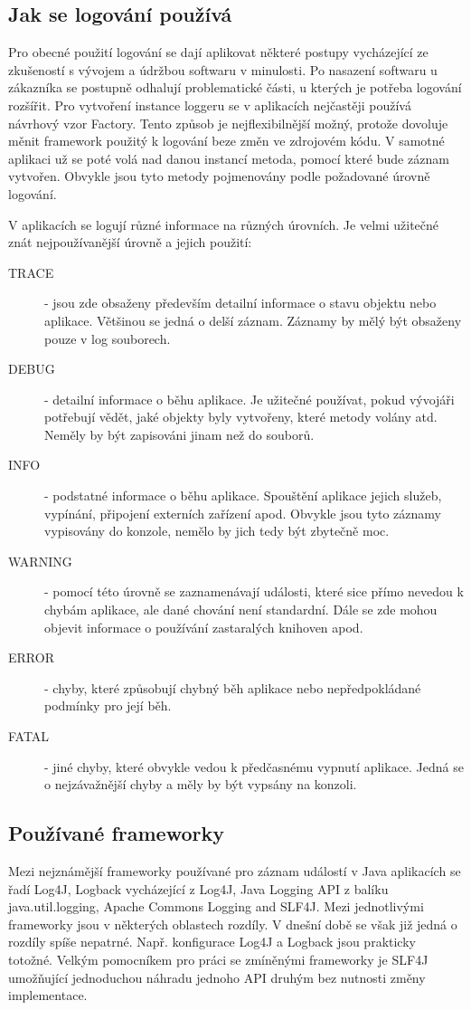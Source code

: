 \documentclass[ing,male,java,dept460]{diploma}		%
\begin{document}
\subsection{Jak se logování používá}
Pro obecné použití logování se dají aplikovat některé postupy vycházející ze zkušeností s vývojem a údržbou softwaru v minulosti. Po nasazení softwaru u zákazníka se postupně odhalují problematické části, u kterých je potřeba logování rozšířit. Pro vytvoření instance loggeru se v aplikacích nejčastěji používá návrhový vzor Factory. Tento způsob je nejflexibilnější možný, protože dovoluje měnit framework použitý k logování beze změn ve zdrojovém kódu. V samotné aplikaci už se poté volá nad danou instancí metoda, pomocí které bude záznam vytvořen. Obvykle jsou tyto metody pojmenovány podle požadované úrovně logování.
\par V aplikacích se logují různé informace na různých úrovních. Je velmi užitečné znát nejpoužívanější úrovně a jejich použití:
\begin{description}
	\item[TRACE] - jsou zde obsaženy především detailní informace o stavu objektu nebo aplikace. Většinou se jedná o delší záznam. Záznamy by mělý být obsaženy pouze v log souborech.
	\item[DEBUG] - detailní informace o běhu aplikace. Je užitečné používat, pokud vývojáři potřebují vědět, jaké objekty byly vytvořeny, které metody volány atd. Neměly by být zapisováni jinam než do souborů.
	\item[INFO] - podstatné informace o běhu aplikace. Spouštění aplikace jejich služeb, vypínání, připojení externích zařízení apod. Obvykle jsou tyto záznamy vypisovány do konzole, nemělo by jich tedy být zbytečně moc.
	\item[WARNING] - pomocí této úrovně se zaznamenávají události, které sice přímo nevedou k chybám aplikace, ale dané chování není standardní. Dále se zde mohou objevit informace o používání zastaralých knihoven apod.
	\item[ERROR] - chyby, které způsobují chybný běh aplikace nebo nepředpokládané podmínky pro její běh.
	\item[FATAL] - jiné chyby, které obvykle vedou k předčasnému vypnutí aplikace. Jedná se o nejzávažnější chyby a měly by být vypsány na konzoli.
\end{description}


\subsection{Používané frameworky}
Mezi nejznámější frameworky používané pro záznam událostí v Java aplikacích se řadí Log4J, Logback vycházející z Log4J, Java Logging API z balíku java.util.logging, Apache Commons Logging and SLF4J. Mezi jednotlivými frameworky jsou v některých oblastech rozdíly. V dnešní době se však již jedná o rozdíly spíše nepatrné. Např. konfigurace Log4J a Logback jsou prakticky totožné. Velkým pomocníkem pro práci se zmíněnými frameworky je SLF4J umožňující jednoduchou náhradu jednoho API druhým bez nutnosti změny implementace.
\end{document}
